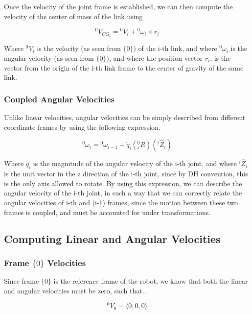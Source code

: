 \noindent Once the velocity of the joint frame is established, we can then compute the velocity of the center of mass of the link using

$$
{}^{0}V_{CG_{i}} = {}^{0}V_i + {}^{0}\omega_i \times r_i
$$

\noindent Where ${}^{0}V_i$ is the velocity (as seen from $\{ 0 \}$) of the i-th link, and where ${}^{0}\omega_i$ is the angular velocity (as seen from $\{ 0 \}$), and where the position vector $r_i$, is the vector from the origin of the i-th link frame to the center of gravity of the same link.



\subsubsection*{Coupled Angular Velocities }

Unlike linear velocities, angular velocities can be simply described from different coordinate frames by using the following expression.


$$
{}^{0}\omega_i = {}^{0}\omega_{i-1} + \dot{q}_{i} \left( {}^{0}_{i}R \right) \left( {}^{i}\hat{Z}_{i}\right)
$$

\noindent Where $\dot{q}_i$ is the magnitude of the angular velocity of the i-th joint, and where  ${}^{i}\hat{Z}_{i}$ is the unit vector in the z direction of the i-th joint, since by DH convention, this is the only axis allowed to rotate. By using this expression, we can describe the angular velocity of the i-th joint, in such a way that we can correctly relate the angular velocities of i-th and (i-1) frames, since the motion between these two frames is coupled, and must be accounted for under transformations.




\subsection*{Computing Linear and Angular Velocities}


\subsubsection*{Frame $\{ 0 \}$ Velocities}

Since frame $\{ 0 \}$ is the reference frame of the robot, we know that both the linear and angular velocities must be zero, such that...

$$
{}^{0}V_{0} = \langle 0,0,0 \rangle
$$

